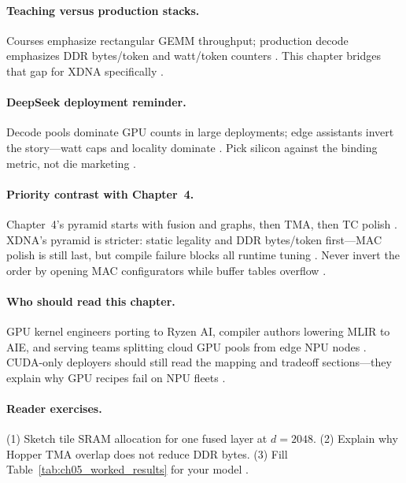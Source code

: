 \paragraph{Teaching versus production stacks.}
Courses emphasize rectangular GEMM throughput; production decode emphasizes DDR bytes/token and watt/token counters \citep{dlbook,taxbreak2026,memoryfloor2026}.
This chapter bridges that gap for XDNA specifically \citep{amd2024aie,yirage2026,patel2025llminference}.

\paragraph{DeepSeek deployment reminder.}
Decode pools dominate GPU counts in large deployments; edge assistants invert the story---watt caps and locality dominate \citep{patel2025llminference,liu2024deepseekv3,amd2024xdna,taxbreak2026,memoryfloor2026}.
Pick silicon against the binding metric, not die marketing \citep{yirage2026,dlbook}.

\paragraph{Priority contrast with Chapter~4.}
Chapter~4's pyramid starts with fusion and graphs, then TMA, then TC polish \citep{memoryfloor2026,taxbreak2026,semianalysis2024tma}.
XDNA's pyramid is stricter: static legality and DDR bytes/token first---MAC polish is still last, but compile failure blocks all runtime tuning \citep{amd2024xdna,yirage2026,patel2025llminference}.
Never invert the order by opening MAC configurators while buffer tables overflow \citep{amd2024aie,memoryfloor2026}.

\paragraph{Who should read this chapter.}
GPU kernel engineers porting to Ryzen AI, compiler authors lowering MLIR to AIE, and serving teams splitting cloud GPU pools from edge NPU nodes \citep{yirage2026,patel2025llminference,nvidia2022hopper}.
CUDA-only deployers should still read the mapping and tradeoff sections---they explain why GPU recipes fail on NPU fleets \citep{amd2024xdna,chen2020compilerbasedhardw}.

\paragraph{Reader exercises.}
(1) Sketch tile SRAM allocation for one fused layer at $d{=}2048$. (2) Explain why Hopper TMA overlap does not reduce DDR bytes. (3) Fill Table~\ref{tab:ch05_worked_results} for your model \citep{taxbreak2026,memoryfloor2026,yirage2026,patel2025llminference,dao2022flashattention,amd2024aie}.


